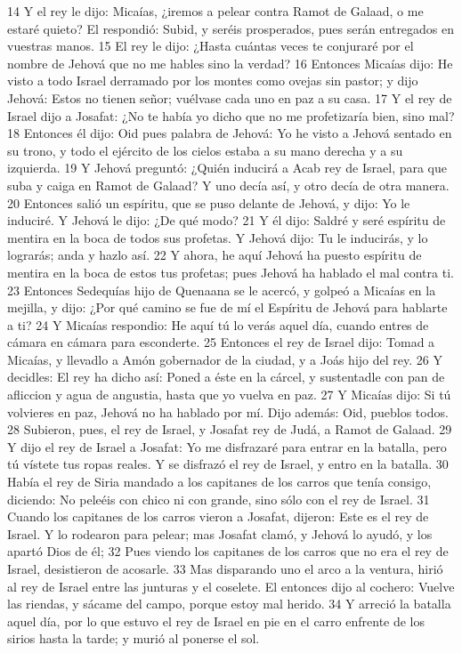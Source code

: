 14 Y el rey le dijo: Micaías, ¿iremos a pelear contra Ramot de Galaad, o me estaré quieto? El respondió: Subid, y seréis prosperados, pues serán entregados en vuestras manos.
15 El rey le dijo: ¿Hasta cuántas veces te conjuraré por el nombre de Jehová que no me hables sino la verdad?
16 Entonces Micaías dijo: He visto a todo Israel derramado por los montes como ovejas sin pastor; y dijo Jehová: Estos no tienen señor; vuélvase cada uno en paz a su casa.
17 Y el rey de Israel dijo a Josafat: ¿No te había yo dicho que no me profetizaría bien, sino mal?
18 Entonces él dijo: Oid pues palabra de Jehová: Yo he visto a Jehová sentado en su trono, y todo el ejército de los cielos estaba a su mano derecha y a su izquierda.
19 Y Jehová preguntó: ¿Quién inducirá a Acab rey de Israel, para que suba y caiga en Ramot de Galaad?  Y uno decía así, y otro decía de otra manera.
20 Entonces salió un espíritu, que se puso delante de Jehová, y dijo: Yo le induciré. Y Jehová le dijo: ¿De qué modo?
21 Y él dijo: Saldré y seré espíritu de mentira en la boca de todos sus profetas. Y Jehová dijo: Tu le inducirás, y lo lograrás; anda y hazlo así.
22 Y ahora, he aquí Jehová ha puesto espíritu de mentira en la boca de estos tus profetas; pues Jehová ha hablado el mal contra ti.
23 Entonces Sedequías hijo de Quenaana se le acercó, y golpeó a Micaías en la mejilla, y dijo: ¿Por qué camino se fue de mí el Espíritu de Jehová para hablarte a ti?
24 Y Micaías respondio: He aquí tú lo verás aquel día, cuando entres de cámara en cámara para esconderte.
25 Entonces el rey de Israel dijo: Tomad a Micaías, y llevadlo a Amón gobernador de la ciudad, y a Joás hijo del rey.
26 Y decidles: El rey ha dicho así: Poned a éste en la cárcel, y sustentadle con pan de afliccion y agua de angustia, hasta que yo vuelva en paz.
27 Y Micaías dijo: Si tú volvieres en paz, Jehová no ha hablado por mí. Dijo además: Oid, pueblos todos.
28 Subieron, pues, el rey de Israel, y Josafat rey de Judá, a Ramot de Galaad.
29 Y dijo el rey de Israel a Josafat: Yo me disfrazaré para entrar en la batalla, pero tú vístete tus ropas reales. Y se disfrazó el rey de Israel, y entro en la batalla.
30 Había el rey de Siria mandado a los capitanes de los carros que tenía consigo, diciendo: No peleéis con chico ni con grande, sino sólo con el rey de Israel.
31 Cuando los capitanes de los carros vieron a Josafat, dijeron: Este es el rey de Israel. Y lo rodearon para pelear; mas Josafat clamó, y Jehová lo ayudó, y los apartó Dios de él;
32 Pues viendo los capitanes de los carros que no era el rey de Israel, desistieron de acosarle.
33 Mas disparando uno el arco a la ventura, hirió al rey de Israel entre las junturas y el coselete. El entonces dijo al cochero: Vuelve las riendas, y sácame del campo, porque estoy mal herido.
34 Y arreció la batalla aquel día, por lo que estuvo el rey de Israel en pie en el carro enfrente de los sirios hasta la tarde; y murió al ponerse el sol. 


